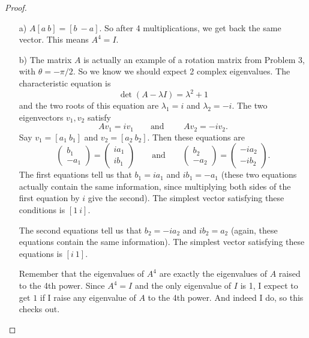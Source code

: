 \documentclass{article}
\theoremstyle{definition}
\begin{document}
\begin{proof}
	\begin{itemize}
		\item[a)] $A[a \ b]= [b \ -a]$. So after 4 multiplications, we get back the same vector. This means $A^4=I$.
	\item[b)] The matrix $A$ is actually an example of a rotation matrix from Problem 3, with $\theta=-\pi/2$. So we know we should expect 2 complex eigenvalues. The characteristic equation is
	\[\det(A- \lambda I)= \lambda^2+1\]
	and the two roots of this equation are $\lambda_1=i$ and $\lambda_2= -i$. The two eigenvectors $v_1, v_2$ satisfy 
	\[A v_1 = i v_1 \qquad \text{and }\qquad A v_2= -i v_2.\]
	Say $v_1= [a_1 \ b_1]$ and $v_2= [a_2 \ b_2]$. Then these equations are
	\[\begin{pmatrix}
		b_1\\-a_1
	\end{pmatrix}=\begin{pmatrix}
	i a_1\\i b_1
\end{pmatrix} \qquad \text{and} \qquad \begin{pmatrix}
b_2\\-a_2
\end{pmatrix}=\begin{pmatrix}
-i a_2\\-i b_2
\end{pmatrix}. \]
	The first equations tell us that $b_1=i a_1$ and $i b_1=-a_1$ (these two equations actually contain the same information, since multiplying both sides of the first equation by $i$ give the second). The simplest vector satisfying these conditions is $[1 \ i]$. 
	
	The second equations tell us that $b_2=-i a_2$ and $ib_2=a_2$ (again, these equations contain the same information). The simplest vector satisfying these equations is $[i \ 1]$.
	
	Remember that the eigenvalues of $A^4$ are exactly the eigenvalues of $A$ raised to the 4th power. Since $A^4=I$ and the only eigenvalue of $I$ is 1, I expect to get $1$ if I raise any eigenvalue of $A$ to the 4th power. And indeed I do, so this checks out.
	

\end{itemize}
\end{proof}
\end{document}
